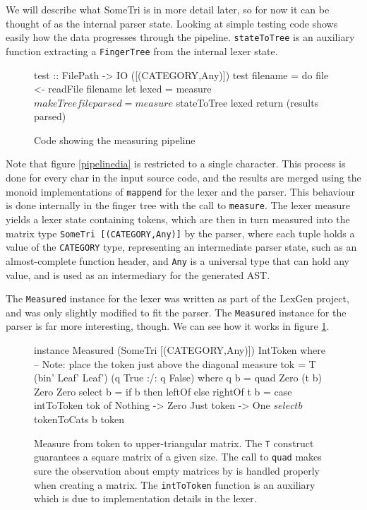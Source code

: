 \documentclass[a4paper,12pt,twosided]{report}
\begin{document}
We will describe what SomeTri is in more detail later, so for now it can be
thought of as the internal parser state. Looking at simple testing
code shows easily how the data progresses through the pipeline.
\texttt{stateToTree} is an auxiliary function extracting a \texttt{FingerTree}
from the internal lexer state.

\begin{figure}[H]
\begin{code}
test :: FilePath -> IO ([(CATEGORY,Any)])
test filename = do
    file <- readFile filename
    let lexed  = measure $ makeTree file
        parsed = measure $ stateToTree lexed
    return (results parsed)
\end{code} 
\caption{Code showing the measuring pipeline}
\end{figure}

Note that figure \ref{pipelinedia} is restricted to a single character. This
process is done for every char in the input source code, and the results are
merged using the monoid implementations of \texttt{mappend} for the lexer and
the parser. This behaviour is done internally in the finger tree with the call
to \texttt{measure}.  The lexer measure yields a lexer state containing tokens,
which are then in turn measured into the matrix type \texttt{SomeTri
[(CATEGORY,Any)]} by the parser, where each tuple holds a value of the
\texttt{CATEGORY} type, representing an intermediate parser state, such as an
almost-complete function header, and \texttt{Any} is a universal type that can
hold any value, and is used as an intermediary for the generated AST. 

The \texttt{Measured} instance for the lexer was written as part of the LexGen
project, and was only slightly modified to fit the parser. The \texttt{Measured}
instance for the parser is far more interesting, though. We can see how it works
in figure \ref{parsemeasure}.

\begin{figure}[H]
\begin{code}
instance Measured (SomeTri [(CATEGORY,Any)]) IntToken where
    -- Note: place the token just above the diagonal
    measure tok = T (bin' Leaf' Leaf') (q True :/: q False)
      where q b = quad Zero (t b) Zero Zero
            select b = if b then leftOf else rightOf
            t b = case intToToken tok of
                Nothing    -> Zero
                Just token -> One $ select b $ tokenToCats b token

\end{code}
\caption{\label{parsemeasure} Measure from token to upper-triangular matrix. The
\texttt{T} construct guarantees a square matrix of a given size. The call to
\texttt{quad} makes sure the observation about empty matrices by
\citet{parparsepaper} is handled properly when creating a matrix. The
\texttt{intToToken} function is an auxiliary which is due to implementation
details in the lexer.}
\end{figure}
\end{document}
